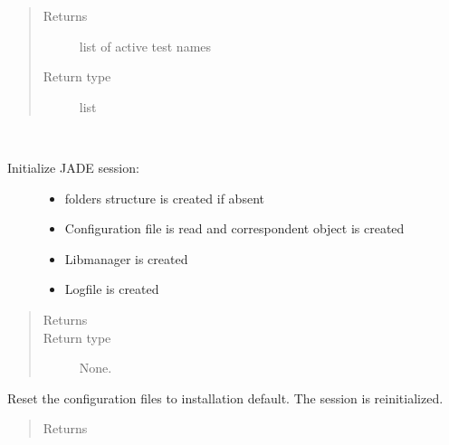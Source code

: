 \documentclass[letterpaper,10pt,english]{sphinxmanual}
\begin{document}
\begin{fulllineitems}
\begin{fulllineitems}
\begin{quote}
\begin{description}
\item[{Returns}] \leavevmode
{} \textendash{} list of active test names

\item[{Return type}] \leavevmode
list

\end{description}\end{quote}

\end{fulllineitems}


\begin{fulllineitems}
\label{\detokenize{api/initobjects:main.Session.initialize}}~\begin{description}
\item[{Initialize JADE session:}] \leavevmode\begin{itemize}
\item {} 
folders structure is created if absent

\item {} 
Configuration file is read and correspondent object is created

\item {} 
Libmanager is created

\item {} 
Logfile is created

\end{itemize}

\end{description}
\begin{quote}\begin{description}
\item[{Returns}] \leavevmode


\item[{Return type}] \leavevmode
None.

\end{description}\end{quote}

\end{fulllineitems}


\begin{fulllineitems}
\label{\detokenize{api/initobjects:main.Session.restore_default_settings}}
Reset the configuration files to installation default. The session
is re\sphinxhyphen{}initialized.
\begin{quote}\begin{description}
\item[{Returns}] \leavevmode



\end{description}
\end{quote}
\end{fulllineitems}
\end{fulllineitems}
\end{document}

